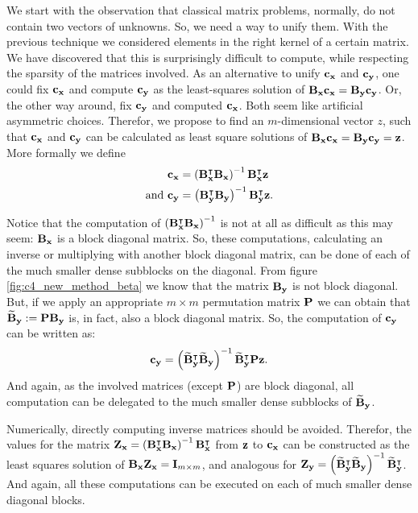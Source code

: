 We start with the observation that classical matrix problems, normally, do not contain two vectors of unknowns. So, we need a way to unify them. With the previous technique we considered elements in the right kernel of a certain matrix. We have discovered that this is surprisingly difficult to compute, while respecting the sparsity of the matrices involved. As an alternative to unify $\vb{c_x}$ and $\vb{c_y}$, one could fix $\vb{c_x}$ and compute $\vb{c_y}$ as the least-squares solution of $\vb{B_x}\vb{c_x} = \vb{B_y}\vb{c_y}$. Or, the other way around, fix $\vb{c_y}$ and computed $\vb{c_x}$. Both seem like artificial asymmetric choices. Therefor, we propose to find an $m$-dimensional vector $z$, such that $\vb{c_x}$ and $\vb{c_y}$ can be calculated as least square solutions of $\vb{B_x}\vb{c_x} = \vb{B_y}\vb{c_y} = \vb{z}$. More formally we define
\begin{align*}
    \vb{c_x}            & = \left(\vb{B_x^\intercal} \vb{B_x}\right)^{-1} \vb{B_x^\intercal} \vb{z}          \\
    \text{and }\vb{c_y} & = \left(\vb{B_y^\intercal} \vb{B_y}\right)^{-1} \vb{B_y^\intercal} \vb{z} \text{.}
\end{align*}

Notice that the computation of $\left(\vb{B_x^\intercal} \vb{B_x}\right)^{-1}$ is not at all as difficult as this may seem: $\vb{B_x}$ is a block diagonal matrix. So, these computations, calculating an inverse or multiplying with another block diagonal matrix, can be done of each of the much smaller dense subblocks on the diagonal. From figure \ref{fig:c4_new_method_beta} we know that the matrix $\vb{B_y}$ is not block diagonal. But, if we apply an appropriate $m \times m$ permutation matrix $\vb{P}$ we can obtain that $\vb{\widetilde{B}_y} := \vb{P} \vb{B_y}$ is, in fact, also a block diagonal matrix. So, the computation of $\vb{c_y}$ can be written as:
$$
    \vb{c_y} = \left(\vb{\widetilde{B}_y^\intercal} \vb{\widetilde{B}_y}\right)^{-1} \vb{\widetilde{B}^\intercal_y} \vb{P} \vb{z} \text{.}
$$
And again, as the involved matrices (except $\vb{P}$) are block diagonal, all computation can be delegated to the much smaller dense subblocks of $\vb{\widetilde{B}_y}$.

Numerically, directly computing inverse matrices should be avoided. Therefor, the values for the matrix $\vb{Z_x} = \left(\vb{B_x^\intercal} \vb{B_x}\right)^{-1} \vb{B_x^\intercal}$ from $\vb{z}$ to $\vb{c_x}$ can be constructed as the least squares solution of $\vb{B_x} \vb{Z_x} = \vb{I}_{m \times m}$, and analogous for $\vb{Z_y} = \left(\vb{\widetilde{B}_y^\intercal} \vb{\widetilde{B}_y}\right)^{-1} \vb{\widetilde{B}^\intercal_y}$. And again, all these computations can be executed on each of much smaller dense diagonal blocks.

